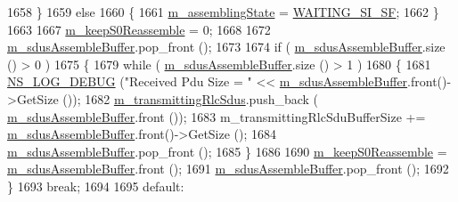 \begin{DoxyCode}
1658                                 \}
1659                               \textcolor{keywordflow}{else}
1660                                 \{
1661                                   \hyperlink{classns3_1_1LteRlcAm_ab6d2954b419df60fc8f8df012fa2709c}{m\_assemblingState} = 
      \hyperlink{classns3_1_1LteRlcAm_a43eeebdccf778e2247c956481ed03d62a967f9c81a213f824b6a908bdfc1a7e4e}{WAITING\_SI\_SF};
1662                                 \}
1663 
1667                               \hyperlink{classns3_1_1LteRlcAm_ab3240ea3468d9b515fc38e717273d3bd}{m\_keepS0Reassemble} = 0;
1668 
1672                               \hyperlink{classns3_1_1LteRlcAm_a075262ee7d8d49e97ab0c48b5e763bf1}{m\_sdusAssembleBuffer}.pop\_front ();
1673 
1674                               \textcolor{keywordflow}{if} ( \hyperlink{classns3_1_1LteRlcAm_a075262ee7d8d49e97ab0c48b5e763bf1}{m\_sdusAssembleBuffer}.size () > 0 )
1675                                 \{
1679                                   \textcolor{keywordflow}{while} ( \hyperlink{classns3_1_1LteRlcAm_a075262ee7d8d49e97ab0c48b5e763bf1}{m\_sdusAssembleBuffer}.size () > 1 )
1680                                     \{
1681                                       \hyperlink{group__logging_ga413f1886406d49f59a6a0a89b77b4d0a}{NS\_LOG\_DEBUG} (\textcolor{stringliteral}{"Received Pdu Size = "} << 
      \hyperlink{classns3_1_1LteRlcAm_a075262ee7d8d49e97ab0c48b5e763bf1}{m\_sdusAssembleBuffer}.front()->GetSize ());
1682                                       \hyperlink{classns3_1_1LteRlcAm_a941fac42e27a28f35b0eea1a02c0595f}{m\_transmittingRlcSdus}.push\_back (
      \hyperlink{classns3_1_1LteRlcAm_a075262ee7d8d49e97ab0c48b5e763bf1}{m\_sdusAssembleBuffer}.front ());
1683                                       m\_transmittingRlcSduBufferSize += 
      \hyperlink{classns3_1_1LteRlcAm_a075262ee7d8d49e97ab0c48b5e763bf1}{m\_sdusAssembleBuffer}.front()->GetSize ();
1684                                       \hyperlink{classns3_1_1LteRlcAm_a075262ee7d8d49e97ab0c48b5e763bf1}{m\_sdusAssembleBuffer}.pop\_front ();
1685                                     \}
1686 
1690                                   \hyperlink{classns3_1_1LteRlcAm_ab3240ea3468d9b515fc38e717273d3bd}{m\_keepS0Reassemble} = 
      \hyperlink{classns3_1_1LteRlcAm_a075262ee7d8d49e97ab0c48b5e763bf1}{m\_sdusAssembleBuffer}.front ();
1691                                   \hyperlink{classns3_1_1LteRlcAm_a075262ee7d8d49e97ab0c48b5e763bf1}{m\_sdusAssembleBuffer}.pop\_front ();
1692                                 \}
1693                       \textcolor{keywordflow}{break};
1694 
1695                       \textcolor{keywordflow}{default}:

\end{DoxyCode}
